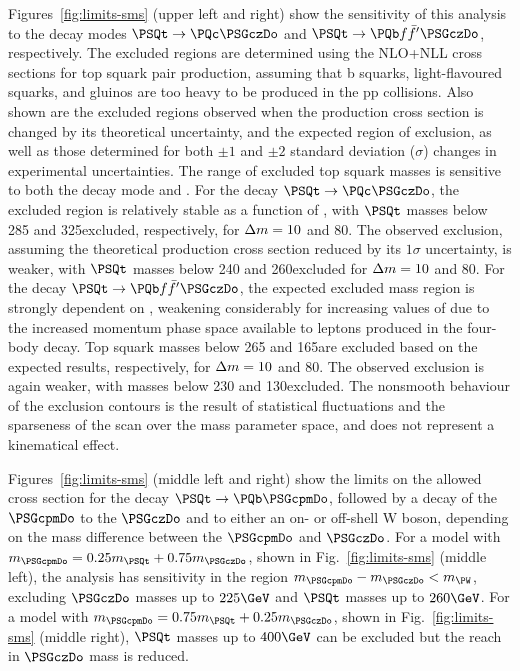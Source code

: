 Figures~\ref{fig:limits-sms} (upper left and right) show the
sensitivity of this analysis to the decay modes $\PSQt \to
\PQc\PSGczDo$ and $\PSQt \to\PQb \ffbp \PSGczDo$, respectively.  The
excluded regions are determined using the NLO+NLL cross sections for
top squark pair production, assuming that b squarks, light-flavoured
squarks, and gluinos are too heavy to be produced in the pp
collisions. Also shown are the excluded regions observed when the
production cross section is changed by its theoretical uncertainty,
and the expected region of exclusion, as well as those determined for
both ${\pm}1$ and ${\pm}2$ standard deviation ($\sigma$) changes in
experimental uncertainties. The range of excluded top squark masses is
sensitive to both the decay mode and \dm. For the decay $\PSQt
\to\PQc\PSGczDo$, the excluded region is relatively stable as a
function of \dm, with $\PSQt$ masses below 285 and 325\GeV excluded,
respectively, for $\Delta m = 10$ and 80\GeV. The observed exclusion,
assuming the theoretical production cross section reduced by its
$1\sigma$ uncertainty, is weaker, with $\PSQt$ masses below 240 and
260\GeV excluded for $\Delta m = 10$ and 80\GeV. For the decay $\PSQt
\to\PQb \ffbp \PSGczDo$, the expected excluded mass region is strongly
dependent on \dm, weakening considerably for increasing values of \dm
due to the increased momentum phase space available to leptons
produced in the four-body decay. Top squark masses below 265 and
165\GeV are excluded based on the expected results, respectively, for
$\Delta m = 10$ and 80\GeV. The observed exclusion is again weaker, with
masses below 230 and 130\GeV excluded. The nonsmooth behaviour of the
exclusion contours is the result of statistical fluctuations and the
sparseness of the scan over the mass parameter space, and does not
represent a kinematical effect.

Figures~\ref{fig:limits-sms} (middle left and right) show the limits
on the allowed cross section for the decay $\PSQt \to \PQb \PSGcpmDo$,
followed by a decay of the $\PSGcpmDo$ to the $\PSGczDo$ and to either
an on- or off-shell W boson, depending on the mass difference between
the $\PSGcpmDo$ and $\PSGczDo$.  For a model with $m_{\PSGcpmDo} =
0.25m_{\PSQt} + 0.75m_{\PSGczDo}$, shown in Fig.~\ref{fig:limits-sms}
(middle left), the analysis has sensitivity in the region
$m_{\PSGcpmDo} - m_{\PSGczDo} < m_{\PW}$, excluding $\PSGczDo$ masses
up to $225 \GeV$ and $\PSQt$ masses up to $260 \GeV$. For a model
with $m_{\PSGcpmDo} = 0.75m_{\PSQt} + 0.25m_{\PSGczDo}$, shown in
Fig.~\ref{fig:limits-sms} (middle right), $\PSQt$ masses up to $400
\GeV$ can be excluded but the reach in $\PSGczDo$ mass is reduced.

